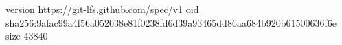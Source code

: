 version https://git-lfs.github.com/spec/v1
oid sha256:9afac99a4f56a052038e81f0238fd6d39a93465dd86aa684b920b61500636f6e
size 43840
